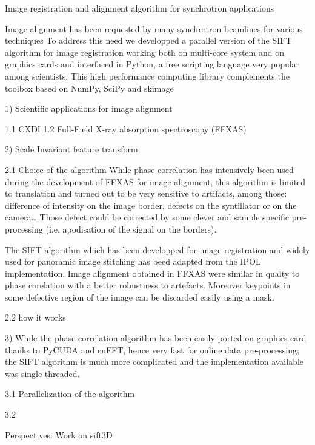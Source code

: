 Image registration and alignment algorithm for synchrotron applications


Image alignment has been requested by many synchrotron beamlines for
various techniques
To address this need we developped a parallel version of the SIFT algorithm
for image registration working both on multi-core system and on graphics cards
and interfaced in Python, a free scripting language very popular among
scientists. This high performance computing library complements the toolbox
based on NumPy\cite{numpy}, SciPy\cite{scipy} and skimage\cite{skimage} 
 
1) Scientific applications for image alignment

1.1 CXDI
1.2 Full-Field X-ray absorption spectroscopy (FFXAS) 

2) Scale Invariant feature transform

2.1 Choice of the algorithm
While phase correlation has intensively been used during the development of
FFXAS for image alignment, this algorithm is limited to translation and turned
out to be very sensitive to artifacts, among those: difference of intensity on
the image border, defects on the syntillator or on the camera\ldots 
Those defect could be corrected by some clever and sample specific
pre-processing (i.e. apodisation of the signal on the borders).

The SIFT algorithm \cite{Lowe1999,Lowe2004} which has been developped
for image registration and widely used for panoramic image stitching has beed
adapted from the IPOL\cite{ASIFT} implementation. Image alignment obtained in
FFXAS were similar in qualty to phase corelation with a better robustness to
artefacts. Moreover keypoints in some defective region of the image can be
discarded easily using a mask.


2.2 how it works


3) 
While the phase correlation algorithm has been easily ported on graphics card
thanks to PyCUDA and cuFFT, hence very fast for online data
pre-processing; 
the SIFT algorithm is much more complicated and the implementation available was
single threaded.

3.1 Parallelization of the algorithm

3.2   

Perspectives: 
Work on sift3D
